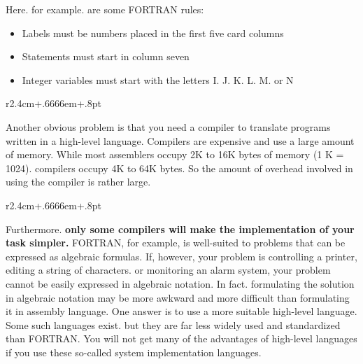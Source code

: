 \documentclass{book}
\begin{document}
Here. for example. are some FORTRAN rules:
\begin{itemize}
\item{Labels must be numbers placed in the first five card columns}
\item{Statements must start in column seven}
\item{Integer variables must start with the letters I. J. K. L. M. or N}
\end{itemize}

\begin{wrapfigure}{r}{2.4cm+.6666em+.8pt}
\end{wrapfigure}
Another obvious problem is that you need a compiler to translate programs written in a high-level language. Compilers are expensive and use a large amount of memory. While most assemblers occupy 2K to 16K bytes of memory (1 K = 1024). compilers occupy 4K to 64K bytes. So the amount of overhead involved in using the compiler is rather large.

\begin{wrapfigure}{r}{2.4cm+.6666em+.8pt}
\end{wrapfigure}
Furthermore. \textbf{only some compilers will make the implementation of your task simpler.} FORTRAN, for example, is well-suited to problems that can be expressed as algebraic formulas. If, however, your problem is controlling a printer, editing a string of characters. or monitoring an alarm system, your problem cannot be easily expressed in algebraic notation. In fact. formulating the solution in algebraic notation may be more awkward and more difficult than formulating it in assembly language. One answer is to use a more suitable high-level language. Some such languages exist. but they are far less widely used and standardized than FORTRAN. You will not get many of the advantages of high-level languages if you use these so-called system implementation languages.
\end{document}
